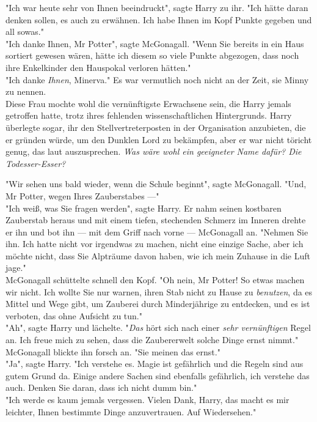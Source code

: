 {"Ich war heute sehr von Ihnen beeindruckt", sagte Harry zu ihr. "Ich hätte daran denken sollen, es auch zu erwähnen. Ich habe Ihnen im Kopf Punkte gegeben und all sowas."\\ "Ich danke Ihnen, Mr Potter", sagte McGonagall. "Wenn Sie bereits in ein Haus sortiert gewesen wären, hätte ich diesem so viele Punkte abgezogen, dass noch ihre Enkelkinder den Hauspokal verloren hätten."\\ "Ich danke \emph{Ihnen}, Minerva." Es war vermutlich noch nicht an der Zeit, sie Minny zu nennen.\\ Diese Frau mochte wohl die vernünftigste Erwachsene sein, die Harry jemals getroffen hatte, trotz ihres fehlenden wissenschaftlichen Hintergrunds. Harry überlegte sogar, ihr den Stellvertreterposten in der Organisation anzubieten, die er gründen würde, um den Dunklen Lord zu bekämpfen, aber er war nicht töricht genug, das laut auszusprechen. \emph{Was wäre wohl ein geeigneter Name dafür? Die Todesser-Esser?}

"Wir sehen uns bald wieder, wenn die Schule beginnt", sagte McGonagall. "Und, Mr Potter, wegen Ihres Zauberstabes ---"\\ "Ich weiß, was Sie fragen werden", sagte Harry. Er nahm seinen kostbaren Zauberstab heraus und mit einem tiefen, stechenden Schmerz im Inneren drehte er ihn und bot ihn --- mit dem Griff nach vorne --- McGonagall an. "Nehmen Sie ihn. Ich hatte nicht vor irgendwas zu machen, nicht eine einzige Sache, aber ich möchte nicht, dass Sie Alpträume davon haben, wie ich mein Zuhause in die Luft jage."\\ McGonagall schüttelte schnell den Kopf. "Oh nein, Mr Potter! So etwas machen wir nicht. Ich wollte Sie nur warnen, ihren Stab nicht zu Hause zu \emph{benutzen}, da es Mittel und Wege gibt, um Zauberei durch Minderjährige zu entdecken, und es ist verboten, das ohne Aufsicht zu tun."\\ "Ah", sagte Harry und lächelte. "\emph{Das} hört sich nach einer \emph{sehr vernünftigen} Regel an. Ich freue mich zu sehen, dass die Zaubererwelt solche Dinge ernst nimmt."\\ McGonagall blickte ihn forsch an. "Sie meinen das ernst."\\ "Ja", sagte Harry. "Ich verstehe es. Magie ist gefährlich und die Regeln sind aus gutem Grund da. Einige andere Sachen sind ebenfalls gefährlich, ich verstehe das auch. Denken Sie daran, dass ich nicht dumm bin."\\ "Ich werde es kaum jemals vergessen. Vielen Dank, Harry, das macht es mir leichter, Ihnen bestimmte Dinge anzuvertrauen. Auf Wiedersehen."

}
